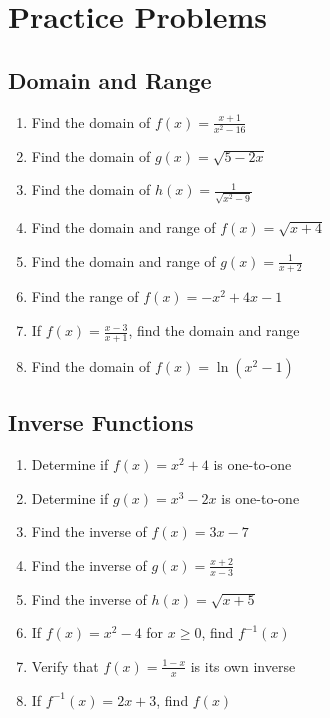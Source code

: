 \documentclass[12pt,a4paper]{article}
\begin{document}
\section{Practice Problems}

\subsection{Domain and Range}

\begin{enumerate}
    \item Find the domain of $f(x) = \frac{x+1}{x^2-16}$
    
    \item Find the domain of $g(x) = \sqrt{5-2x}$
    
    \item Find the domain of $h(x) = \frac{1}{\sqrt{x^2-9}}$
    
    \item Find the domain and range of $f(x) = \sqrt{x+4}$
    
    \item Find the domain and range of $g(x) = \frac{1}{x+2}$
    
    \item Find the range of $f(x) = -x^2 + 4x - 1$
    
    \item If $f(x) = \frac{x-3}{x+1}$, find the domain and range
    
    \item Find the domain of $f(x) = \ln(x^2 - 1)$
\end{enumerate}

\subsection{Inverse Functions}

\begin{enumerate}[resume]
    \item Determine if $f(x) = x^2 + 4$ is one-to-one
    
    \item Determine if $g(x) = x^3 - 2x$ is one-to-one
    
    \item Find the inverse of $f(x) = 3x - 7$
    
    \item Find the inverse of $g(x) = \frac{x+2}{x-3}$
    
    \item Find the inverse of $h(x) = \sqrt{x+5}$
    
    \item If $f(x) = x^2 - 4$ for $x \geq 0$, find $f^{-1}(x)$
    
    \item Verify that $f(x) = \frac{1-x}{x}$ is its own inverse
    
    \item If $f^{-1}(x) = 2x + 3$, find $f(x)$
\end{enumerate}
\end{document}
